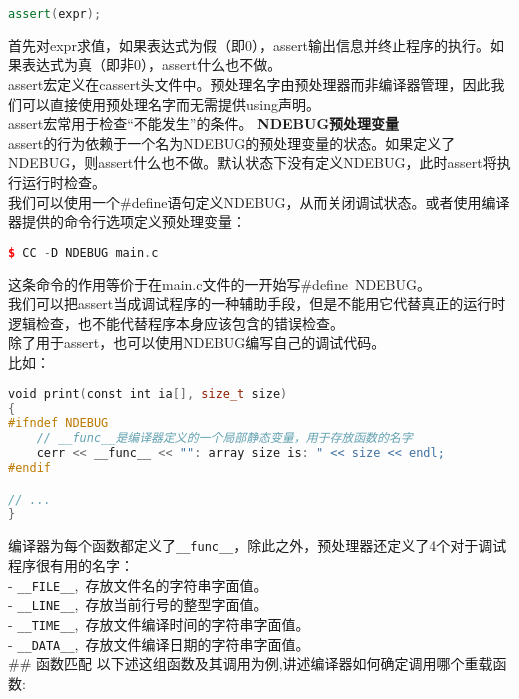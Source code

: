 \documentclass[
  a4paper,
  oneside,tablecaptionabove
]{scrbook}
\begin{document}
\begin{lstlisting}[language={C++}]
assert(expr);
\end{lstlisting}

首先对expr求值，如果表达式为假（即0），assert输出信息并终止程序的执行。如果表达式为真（即非0），assert什么也不做。\\
assert宏定义在cassert头文件中。预处理名字由预处理器而非编译器管理，因此我们可以直接使用预处理名字而无需提供using声明。\\
assert宏常用于检查\enquote{不能发生}的条件。 \textbf{NDEBUG预处理变量}\\
assert的行为依赖于一个名为NDEBUG的预处理变量的状态。如果定义了NDEBUG，则assert什么也不做。默认状态下没有定义NDEBUG，此时assert将执行运行时检查。\\
我们可以使用一个\#define语句定义NDEBUG，从而关闭调试状态。或者使用编译器提供的命令行选项定义预处理变量：

\begin{lstlisting}[language={C++}]
$ CC -D NDEBUG main.c
\end{lstlisting}

这条命令的作用等价于在main.c文件的一开始写\#define~NDEBUG。\\
我们可以把assert当成调试程序的一种辅助手段，但是不能用它代替真正的运行时逻辑检查，也不能代替程序本身应该包含的错误检查。\\
除了用于assert，也可以使用NDEBUG编写自己的调试代码。\\
比如：

\begin{lstlisting}[language={C++}]
void print(const int ia[], size_t size)
{
#ifndef NDEBUG
    // __func__是编译器定义的一个局部静态变量，用于存放函数的名字
    cerr << __func__ << "": array size is: " << size << endl;
#endif

// ...
}
\end{lstlisting}

编译器为每个函数都定义了\lstinline!__func__!，除此之外，预处理器还定义了4个对于调试程序很有用的名字：\\
- \lstinline!__FILE__!,~存放文件名的字符串字面值。\\
- \lstinline!__LINE__!,~存放当前行号的整型字面值。\\
- \lstinline!__TIME__!,~存放文件编译时间的字符串字面值。\\
- \lstinline!__DATA__!,~存放文件编译日期的字符串字面值。\\
\#\# 函数匹配
以下述这组函数及其调用为例,讲述编译器如何确定调用哪个重载函数:
\end{document}
